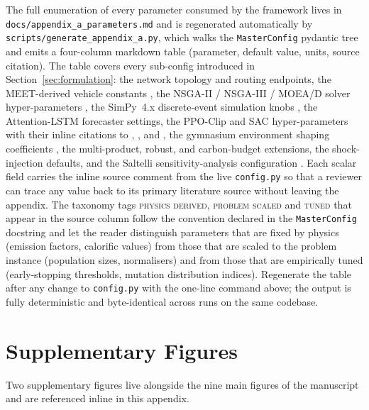 \documentclass[review,preprint,authoryear,12pt]{elsarticle}
\begin{document}
The full enumeration of every parameter consumed by the framework
lives in \texttt{docs/appendix\_a\_parameters.md} and is regenerated
automatically by \texttt{scripts/generate\_appendix\_a.py}, which
walks the \texttt{MasterConfig} pydantic tree and emits a four-column
markdown table (parameter, default value, units, source citation).
The table covers every sub-config introduced in
Section~\ref{sec:formulation}: the network topology and routing
endpoints, the MEET-derived vehicle constants
\citep{hickman1999meet, ntziachristos2009copert}, the
NSGA-II / NSGA-III / MOEA/D solver hyper-parameters
\citep{deb2002nsga2, debjain2014nsga3, zhang2007moead, blank2020pymoo},
the SimPy~4.x discrete-event simulation knobs
\citep{simpy41_docs}, the Attention-LSTM forecaster settings, the
PPO-Clip and SAC hyper-parameters with their inline citations to
\citet{schulman2017ppo}, \citet{andrychowicz2021what},
\citet{huang2022ppo} and \citet{haarnoja2018sac}, the gymnasium
environment shaping coefficients
\citep{towers2024gymnasium}, the multi-product, robust, and
carbon-budget extensions, the shock-injection defaults, and the
Saltelli sensitivity-analysis configuration
\citep{saltelli2010variance, herman2017salib}. Each scalar field
carries the inline source comment from the live \texttt{config.py}
so that a reviewer can trace any value back to its primary literature
source without leaving the appendix. The taxonomy tags
\textsc{physics derived}, \textsc{problem scaled} and \textsc{tuned}
that appear in the source column follow the convention declared in
the \texttt{MasterConfig} docstring and let the reader distinguish
parameters that are fixed by physics (emission factors, calorific
values) from those that are scaled to the problem instance
(population sizes, normalisers) and from those that are empirically
tuned (early-stopping thresholds, mutation distribution indices).
Regenerate the table after any change to \texttt{config.py} with the
one-line command above; the output is fully deterministic and
byte-identical across runs on the same codebase.

\section{Supplementary Figures}
\label{appendix:supplementary}

Two supplementary figures live alongside the nine main figures of
the manuscript and are referenced inline in this appendix.
\end{document}
